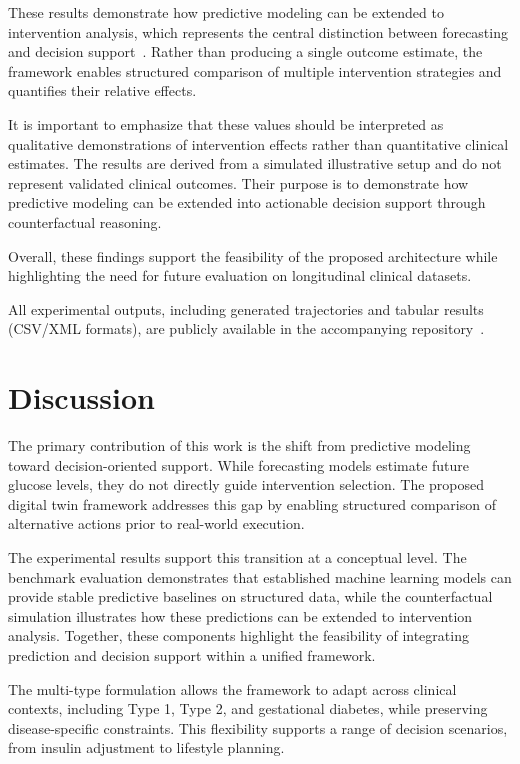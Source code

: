 \documentclass[journal]{IEEEtran}
\begin{document}
These results demonstrate how predictive modeling can be extended to intervention analysis, which represents the central distinction between forecasting and decision support~\cite{ref18,ref19,ref33}. Rather than producing a single outcome estimate, the framework enables structured comparison of multiple intervention strategies and quantifies their relative effects.

It is important to emphasize that these values should be interpreted as qualitative demonstrations of intervention effects rather than quantitative clinical estimates. The results are derived from a simulated illustrative setup and do not represent validated clinical outcomes. Their purpose is to demonstrate how predictive modeling can be extended into actionable decision support through counterfactual reasoning.

Overall, these findings support the feasibility of the proposed architecture while highlighting the need for future evaluation on longitudinal clinical datasets.

All experimental outputs, including generated trajectories and tabular results (CSV/XML formats), are publicly available in the accompanying repository~\cite{ref41}.

\section{Discussion}
The primary contribution of this work is the shift from predictive modeling toward decision-oriented support. While forecasting models estimate future glucose levels, they do not directly guide intervention selection. The proposed digital twin framework addresses this gap by enabling structured comparison of alternative actions prior to real-world execution.

The experimental results support this transition at a conceptual level. The benchmark evaluation demonstrates that established machine learning models can provide stable predictive baselines on structured data, while the counterfactual simulation illustrates how these predictions can be extended to intervention analysis. Together, these components highlight the feasibility of integrating prediction and decision support within a unified framework.

The multi-type formulation allows the framework to adapt across clinical contexts, including Type 1, Type 2, and gestational diabetes, while preserving disease-specific constraints. This flexibility supports a range of decision scenarios, from insulin adjustment to lifestyle planning.
\end{document}
